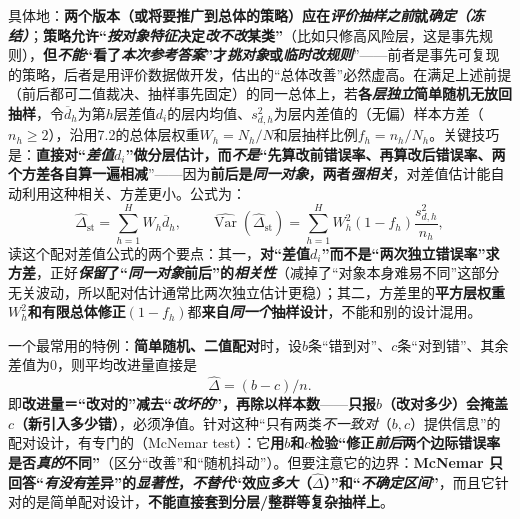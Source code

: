 具体地：\textbf{两个版本（或将要推广到总体的策略）应在\emph{评价抽样之前}就\emph{确定（冻结）}}；\textbf{策略允许“\emph{按对象特征}决定\emph{改不改}某类”}（比如只修高风险层，这是事先规则），\textbf{但\emph{不能}“看了\emph{本次参考答案}”才\emph{挑对象}或\emph{临时改规则}}”——前者是事先可复现的策略，后者是用评价数据做开发，估出的“总体改善”必然虚高。在满足上述前提（前后都可二值裁决、抽样事先固定）的同一总体上，若\textbf{各\emph{层}\emph{独立}简单随机无放回抽样}，令$\overline d_h$为第$h$层差值$d_i$的层内均值、$s_{d,h}^2$为层内差值的（无偏）样本方差（$n_h\geq2$），沿用7.2的总体层权重$W_h=N_h/N$和层抽样比例$f_h=n_h/N_h$。关键技巧是：\textbf{直接对“\emph{差值}$d_i$”做分层估计，而\emph{不是}“先算改前错误率、再算改后错误率、两个方差各自算一遍相减}”——因为\textbf{前后是\emph{同一对象}，两者\emph{强相关}}，对差值估计能自动利用这种相关、方差更小。公式为：
\begin{equation}
  \widehat\Delta_{\mathrm{st}}
  =
  \sum_{h=1}^{H}W_h\overline d_h,
  \qquad
  \widehat{\operatorname{Var}}(\widehat\Delta_{\mathrm{st}})
  =
  \sum_{h=1}^{H}W_h^2(1-f_h)\frac{s_{d,h}^2}{n_h},
  \label{eq:knowledge-quality-assessment-correction-paired-difference}
\end{equation}
读这个配对差值公式的两个要点：其一，\textbf{对“差值$d_i$”而不是“两次独立错误率”求方差}，正好\textbf{\emph{保留}了“\emph{同一对象}前后”的\emph{相关性}}（减掉了“对象本身难易不同”这部分无关波动，所以配对估计通常比两次独立估计更稳）；其二，方差里的\textbf{平方层权重$W_h^2$和有限总体修正$(1-f_h)$}都\textbf{来自\emph{同一个}抽样设计}，不能和别的设计混用。

一个最常用的特例：\textbf{简单随机、二值配对}时，设$b$条“错到对”、$c$条“对到错”、其余差值为0，则平均改进量直接是
$$\widehat\Delta=(b-c)/n.$$
即\textbf{改进量＝“改对的”减去“\emph{改坏的}”，再除以样本数}——\textbf{只报$b$（改对多少）会掩盖$c$（新引入多少错）}，必须净值。针对这种“只有两类\emph{不一致对}（$b,c$）提供信息”的配对设计，有专门的（McNemar test）：它\textbf{用$b$和$c$检验“修正\emph{前后}两个边际错误率是否\emph{真的}不同”}（区分“改善”和“随机抖动”）。但要注意它的边界：\textbf{McNemar 只回答“\emph{有没有}差异”的\emph{显著性}，\emph{不替代}“效应\emph{多大}（$\widehat\Delta$）”和“\emph{不确定区间}”}，而且它针对的是简单配对设计，\textbf{不能直接套到分层/整群等复杂抽样上}。

